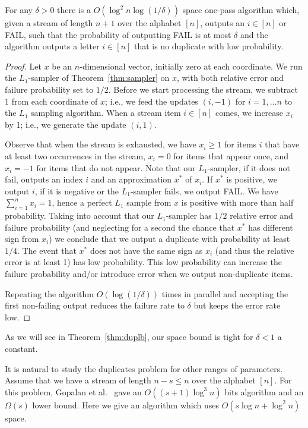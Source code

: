\begin{theorem}\label{thm:dupub}
For any $\delta>0$ there is a $O(\log^2 n\log(1/\delta))$ space one-pass
algorithm which, given a stream of length $n+1$ over the alphabet $[n]$,
outputs an $i\in[n]$ or FAIL, such that the probability of outputting FAIL
is at most $\delta$ and the algorithm outputs a letter $i\in[n]$ that is no
duplicate with low probability.
\end{theorem}
\begin{proof}
Let $x$ be an $n$-dimensional vector, initially zero at each coordinate. We
run the $L_1$-sampler of Theorem~\ref{thm:sampler} on $x$, with both relative error
and failure probability set to $1/2$. Before we start processing the
stream, we subtract 1 from each coordinate of $x$; i.e., we feed the updates
$(i,-1)$ for $i=1,\ldots n$ to the $L_1$ sampling algorithm. When a stream
item $i\in [n]$ comes, we increase $x_i$ by 1; i.e., we generate the update
$(i,1)$.

Observe that when the stream is exhausted, we have $x_i\geq 1$ for items $i$
that have at least two occurrences in the stream, $x_i=0$ for items that
appear once, and $x_i=-1$ for items that do not appear.  Note that our
$L_1$-sampler, if it does not fail, outputs an index $i$ and an approximation
$x^*$ of $x_i$. If $x^*$ is positive, we output $i$, if it is
negative or the $L_1$-sampler fails, we output FAIL. We have
$\sum_{i=1}^nx_i=1$,  hence a perfect $L_1$ sample from $x$ is positive with
more than half probability. Taking into account that our $L_1$-sampler has
$1/2$ relative error and failure probability (and neglecting for a second the
chance that $x^*$ has different sign from $x_i$) we conclude that we output a
duplicate with probability at least $1/4$. The event that $x^*$ does not have
the same sign as $x_i$ (and thus the relative error is at least 1) has low
probability. This low probability can increase the failure probability and/or
introduce error when we output non-duplicate items.

Repeating the algorithm $O(\log(1/\delta))$ times in parallel and accepting
the first non-failing output reduces the failure rate to
$\delta$ but keeps the error rate low.
\end{proof}

As we will see in Theorem~\ref{thm:duplb}, our space bound is tight for
$\delta<1$ a constant. 

It is natural to study the duplicates problem for other ranges of
parameters. Assume that we have a stream of length $n-s\le n$ over the
alphabet $[n]$. For this problem, Gopalan et al.\ \cite{GopalanJaikumar} gave
an $O((s+1)\log^3 n)$ bits algorithm and an $\Omega(s)$ lower bound. Here we
give an algorithm which uses $O(s\log n+\log^2 n)$ space.

